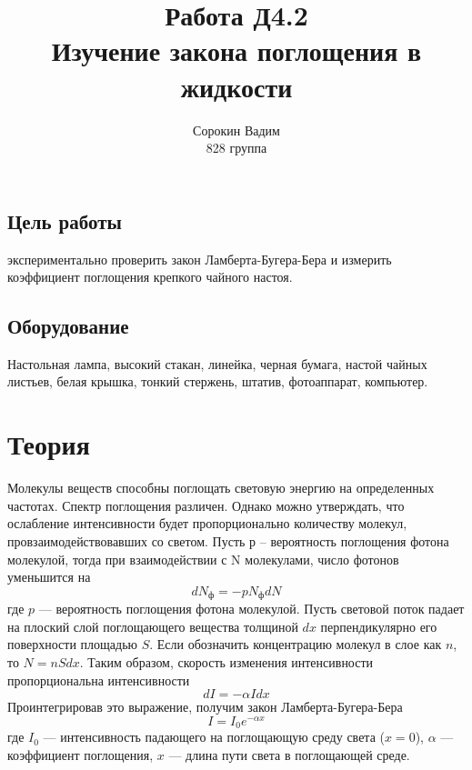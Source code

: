 \documentclass[a4paper, 12pt]{article}%
\author{Сорокин Вадим\\
828 группа}
\title{\textbf{Работа Д4.2\\
Изучение закона поглощения в жидкости}}
\date{}
\begin{document}
\maketitle
\subsection*{Цель работы}
экспериментально проверить закон Ламберта-Бугера-Бера и измерить коэффициент поглощения крепкого чайного настоя.
\subsection*{Оборудование}
Настольная лампа, высокий стакан, линейка, черная бумага, настой чайных листьев, белая крышка, тонкий стержень, штатив, фотоаппарат, компьютер.
\section*{Теория}
Молекулы веществ способны поглощать световую энергию на определенных частотах. Спектр поглощения различен. Однако можно утверждать, что ослабление интенсивности будет пропорционально количеству молекул, провзаимодействовавших со светом. Пусть р – вероятность поглощения фотона молекулой, тогда при взаимодействии с N молекулами, число фотонов уменьшится на
\[dN_{\text{ф}} = - p N_{\text{ф}}dN\]
где $p$ --- вероятность поглощения фотона молекулой.
Пусть световой поток падает на плоский слой поглощающего вещества толщиной $dx$ перпендикулярно его поверхности площадью $S$. Если обозначить концентрацию молекул в слое как $n$, то $N = nSdx$. Таким образом, скорость изменения интенсивности пропорциональна интенсивности 
\[dI =-\alpha I dx\]
Проинтегрировав это выражение, получим закон Ламберта-Бугера-Бера 
\[I = I_0e^{-\alpha x}\]
где $I_0$ --- интенсивность падающего на поглощающую среду света ($x = 0$), $\alpha$ --- коэффициент поглощения, $x$ --- длина пути света в поглощающей среде.
\end{document}

